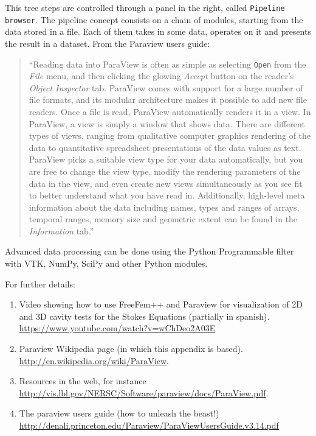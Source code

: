 \documentclass[12pt]{article}
\begin{document}
This tree steps are controlled through a panel in the right, called
\texttt{Pipeline browser}. The pipeline concept consists on a chain of
modules, starting from the data stored in a file. Each
of them takes in some data, operates on it and presents the result in
a dataset.
From the Paraview users guide:
\begin{quote}\small
  ``Reading data into ParaView is often as simple as selecting
  \texttt{Open} from the \textit{File} menu, and then clicking the
  glowing \textit{Accept} button on the reader's \textit{Object
    Inspector} tab. ParaView comes with support for a large number of
  file formats, and its modular architecture makes it possible to add
  new file readers.  Once a file is read, ParaView automatically
  renders it in a view. In ParaView, a view is simply a window that
  shows data. There are different types of views, ranging from
  qualitative computer graphics rendering of the data to quantitative
  spreadsheet presentations of the data values as text. ParaView picks
  a suitable view type for your data automatically, but you are free
  to change the view type, modify the rendering parameters of the data
  in the view, and even create new views simultaneously as you see fit
  to better understand what you have read in. Additionally, high-level
  meta information about the data including names, types and ranges of
  arrays, temporal ranges, memory size and geometric extent can be
  found in the \textit{Information} tab.''
\end{quote}
Advanced data processing can be done using the Python Programmable
filter with VTK, NumPy, SciPy and other Python modules.

\bigskip

For further details:
\begin{enumerate}
\item Video showing how to use FreeFem++ and Paraview for
  visualization of 2D and 3D cavity tests for the Stokes Equations
  (partially in
  spanish). \url{https://www.youtube.com/watch?v=wChDeo2A03E}
\item Paraview Wikipedia page (in which this appendix is
  based). \url{http://en.wikipedia.org/wiki/ParaView}.
\item Resources in the web, for instance
  \url{http://vis.lbl.gov/NERSC/Software/paraview/docs/ParaView.pdf}.
\item The paraview users guide (how to unleash the beast!)
  \url{http://denali.princeton.edu/Paraview/ParaViewUsersGuide.v3.14.pdf}
\end{enumerate}
\end{document}
